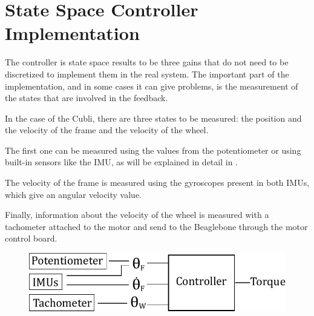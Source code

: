 \section{State Space Controller Implementation}\label{sec:SSImplementation}
The controller is state space results to be three gains that do not need to be discretized to implement them in the real system. The important part of the implementation, and in some cases it can give problems, is the measurement of the states that are involved in the feedback.

In the case of the Cubli, there are three states to be measured: the position and the velocity of the frame and the velocity of the wheel.

The first one can be measured using the values from the potentiometer or using built-in sensors like the IMU, as will be explained in detail in .

The velocity of the frame is measured using the gyroscopes present in both IMUs, which give an angular velocity value.

Finally, information about the velocity of the wheel is measured with a tachometer attached to the motor and send to the Beaglebone through the motor control board. 
\\
\begin{figure}[H]\vspace{-4mm}
	\centering
	\includegraphics[scale=.75]{figures/measurements}
	\label{fig:measurements}
\end{figure}\vspace{-5mm}